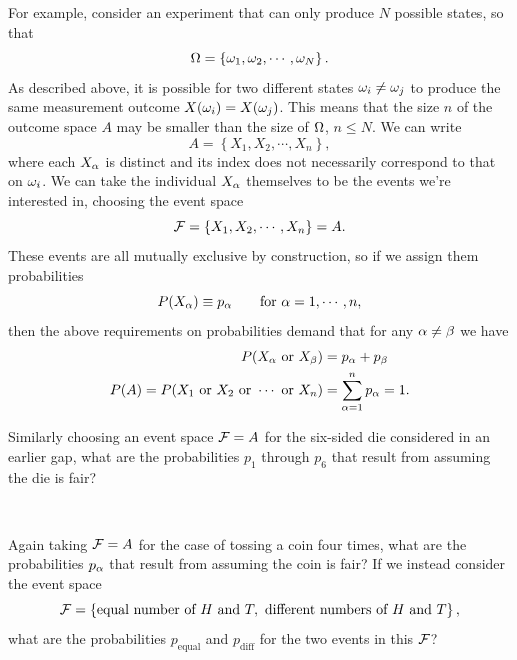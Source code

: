 For example, consider an experiment that can only produce $N$ possible states, so that
\begin{equation*}
  \Omega = \left\{\omega_1, \omega_2, \cdots, \omega_N\right\}.
\end{equation*}
As described above, it is possible for two different states $\omega_i \ne \omega_j$ to produce the same measurement outcome $X(\omega_i) = X(\omega_j)$.
This means that the size $n$ of the outcome space $A$ may be smaller than the size of $\Omega$, $n \leq N$.
We can write
\begin{equation*}
  A = \left\{X_1, X_2, \cdots, X_n\right\},
\end{equation*}
where each $X_{\alpha}$ is distinct and its index does not necessarily correspond to that on $\omega_i$.
We can take the individual $X_{\alpha}$ themselves to be the events we're interested in, choosing the event space
\begin{equation}
  \label{eq:finite_set}
  \mathcal F = \left\{X_1, X_2, \cdots, X_n\right\} = A.
\end{equation}
These events are all mutually exclusive by construction, so if we assign them probabilities
\begin{equation*}
  P(X_{\alpha}) \equiv p_{\alpha} \qquad \mbox{for } \alpha = 1, \cdots, n,
\end{equation*}
then the above requirements on probabilities demand that for any $\alpha \ne \beta$ we have
\begin{align*}
  P(X_{\alpha} \mbox{ or } X_{\beta}) & = p_{\alpha} + p_{\beta} \\
  P(A) = P(X_1 \hbox{ or } X_2 \hbox{ or } \cdots \mbox{ or } X_n) & = \sum_{\alpha = 1}^n p_{\alpha} = 1.
\end{align*}

Similarly choosing an event space $\mathcal F = A$ for the six-sided die considered in an earlier gap, what are the probabilities $p_1$ through $p_6$ that result from assuming the die is fair?
\begin{mdframed}
  \ \\[100 pt]
\end{mdframed}
Again taking $\mathcal F = A$ for the case of tossing a coin four times, what are the probabilities $p_{\alpha}$ that result from assuming the coin is fair?
If we instead consider the event space
\begin{equation*}
  \mathcal F = \left\{\mbox{equal number of } H \mbox{ and } T, \mbox{ different numbers of } H \mbox{ and } T\right\},
\end{equation*}
what are the probabilities $p_{\text{equal}}$ and $p_{\text{diff}}$ for the two events in this $\mathcal F$?
\begin{mdframed}
  \ \\[100 pt]
\end{mdframed}

